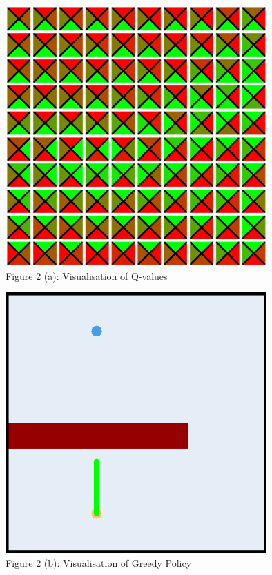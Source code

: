 \documentclass[12pt]{article}
\begin{document}
\clearpage
\begin{figure}
    \centering
    \includegraphics[width=10cm]{figures/2a.png}
    \caption*{Figure 2 (a): Visualisation of Q-values}
\end{figure}
\begin{figure}
    \centering
    \includegraphics[width=10cm]{figures/2b.png}
    \caption*{Figure 2 (b): Visualisation of Greedy Policy}
\end{figure}
\end{document}

